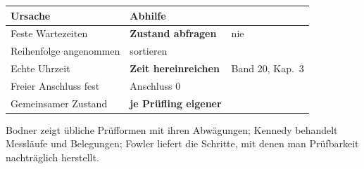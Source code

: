 \begin{aufgabe}
\begin{warnung}
\begin{center}
\renewcommand{\arraystretch}{1.5}
\begin{tabular}{@{}P{3.0cm}P{2.2cm}P{2.8cm}@{}}
\toprule
\textbf{Ursache} & \textbf{Abhilfe} & \\
\midrule
Feste Wartezeiten & \textbf{Zustand abfragen} & \textcolor{akzent}{nie }\\
Reihenfolge angenommen & \textcolor{gruen}{sortieren} & \\
Echte Uhrzeit & \textbf{Zeit hereinreichen} & \textcolor{gruen}{Band 20, Kap.~3}\\
Freier Anschluss fest & Anschluss $0$ & \\
Gemeinsamer Zustand & \textcolor{gruen}{\textbf{je Prüfling eigener}} & \\
\bottomrule
\end{tabular}
\end{center}

\begin{center}
\begin{minipage}{0.88\textwidth}
\end{minipage}
\end{center}

\begin{center}
\end{center}
\end{warnung}
\end{aufgabe}
\vspace{-4pt}
\noindent Bodner zeigt üb\-li\-che Prüf\-for\-men mit ihren Ab\-wä\-gun\-gen; Ken\-ne\-dy behandelt Mess\-läu\-fe und Be\-le\-gun\-gen; Fowler liefert die Schritte, mit denen man Prüf\-bar\-keit nach\-träg\-lich herstellt.
